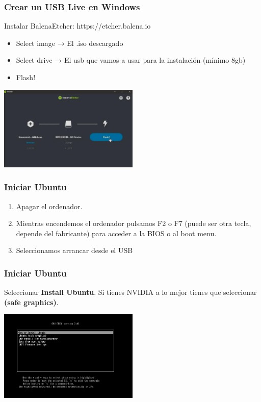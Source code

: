 \documentclass[10pt]{beamer}
\begin{document}
	\begin{frame}
		\frametitle{Crear un USB Live en Windows}
		Instalar BalenaEtcher: https://etcher.balena.io\\
		\begin{itemize}
			\item Select image → El .iso descargado
			\item Select drive → El usb que vamos a usar para la instalación (mínimo 8gb)
			\item Flash!
		\end{itemize}
		\begin{center}
			\includegraphics[width=0.5\textwidth]{balena}
		\end{center}
	\end{frame}
	
	\begin{frame}
		\frametitle{Iniciar Ubuntu}
		\begin{enumerate}
			\item Apagar el ordenador.
			\item Mientras encendemos el ordenador pulsamos F2 o F7 (puede ser otra tecla, depende del fabricante) para acceder a la BIOS o al boot menu.
			\item Seleccionamos arrancar desde el USB
		\end{enumerate}
	\end{frame}
	
	\begin{frame}
		\frametitle{Iniciar Ubuntu}
		Seleccionar \textbf{Install Ubuntu}. Si tienes NVIDIA a lo mejor tienes que seleccionar \textbf{(safe graphics)}.\\
		\begin{center}
			\includegraphics[width=0.5\textwidth]{install}
		\end{center}
	\end{frame}
	
\end{document}
